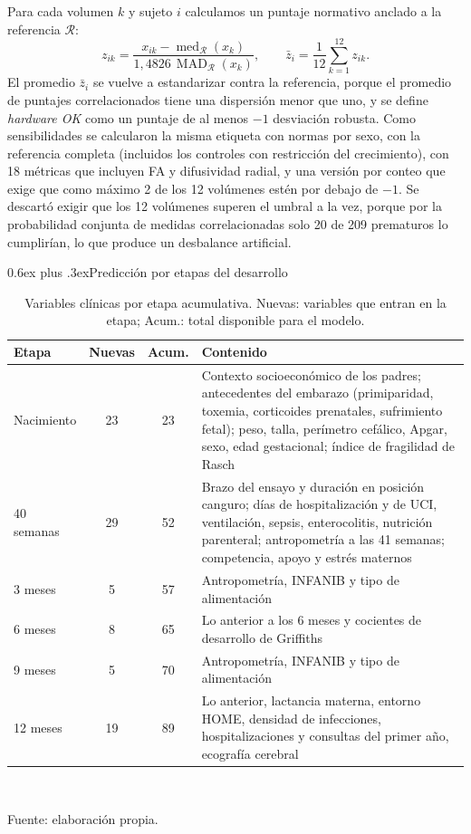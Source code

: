 \documentclass[conference,letterpaper,10pt]{IEEEtran}
\makeatletter
\def\subsection{\@startsection{subsection}{2}{\z@}{1.5ex plus 1ex minus .5ex}%
  {0.6ex plus .3ex}{\normalfont\normalsize\bfseries}}
\makeatother
\begin{document}
Para cada volumen $k$ y sujeto $i$ calculamos un puntaje normativo anclado a la referencia $\mathcal{R}$:
\begin{equation}
z_{ik} = \frac{x_{ik} - \operatorname{med}_{\mathcal{R}}(x_k)}{1{,}4826\,\operatorname{MAD}_{\mathcal{R}}(x_k)}, \qquad
\bar z_i = \frac{1}{12}\sum_{k=1}^{12} z_{ik}.
\label{eq:norma}
\end{equation}
El promedio $\bar z_i$ se vuelve a estandarizar contra la referencia, porque el promedio de puntajes correlacionados tiene una dispersión menor que uno, y se define \emph{hardware OK} como un puntaje de al menos $-1$ desviación robusta. Como sensibilidades se calcularon la misma etiqueta con normas por sexo, con la referencia completa (incluidos los controles con restricción del crecimiento), con 18 métricas que incluyen FA y difusividad radial, y una versión por conteo que exige que como máximo 2 de los 12 volúmenes estén por debajo de $-1$. Se descartó exigir que los 12 volúmenes superen el umbral a la vez, porque por la probabilidad conjunta de medidas correlacionadas solo 20 de 209 prematuros lo cumplirían, lo que produce un desbalance artificial.

\subsection{Predicción por etapas del desarrollo}
\begin{table}[t]
\caption{Variables clínicas por etapa acumulativa. Nuevas: variables que entran en la etapa; Acum.: total disponible para el modelo.}
\label{tab:variables}
\centering
\footnotesize
\setlength{\tabcolsep}{3pt}
\begin{tabular}{@{}lcc>{\raggedright\arraybackslash}p{}@{}}
\toprule
Etapa & Nuevas & Acum. & Contenido \\
\midrule
Nacimiento & 23 & 23 & Contexto socioeconómico de los padres; antecedentes del embarazo (primiparidad, toxemia, corticoides prenatales, sufrimiento fetal); peso, talla, perímetro cefálico, Apgar, sexo, edad gestacional; índice de fragilidad de Rasch \\
40 semanas & 29 & 52 & Brazo del ensayo y duración en posición canguro; días de hospitalización y de UCI, ventilación, sepsis, enterocolitis, nutrición parenteral; antropometría a las 41 semanas; competencia, apoyo y estrés maternos \\
3 meses & 5 & 57 & Antropometría, INFANIB y tipo de alimentación \\
6 meses & 8 & 65 & Lo anterior a los 6 meses y cocientes de desarrollo de Griffiths \\
9 meses & 5 & 70 & Antropometría, INFANIB y tipo de alimentación \\
12 meses & 19 & 89 & Lo anterior, lactancia materna, entorno HOME, densidad de infecciones, hospitalizaciones y consultas del primer año, ecografía cerebral \\
\bottomrule
\end{tabular}\\[2pt]
\parbox{\columnwidth}{\scriptsize Fuente: elaboración propia.}
\end{table}
\end{document}
